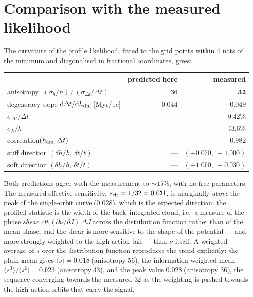 \documentclass[11pt,a4paper]{article}
\newcommand{\hdm}{h_{\rm dm}}
\newcommand{\dt}{\Delta t}
\begin{document}
\section{Comparison with the measured likelihood}

The curvature of the profile likelihood, fitted to the grid points within 4 nats
of the minimum and diagonalised in fractional coordinates, gives:

\begin{center}
\begin{tabular}{lrr}
\toprule
 & predicted here & measured \\
\midrule
anisotropy $\;(\sigma_h/h)\,/\,(\sigma_{\dt}/\dt)$ & $36$ & $\mathbf{32}$ \\
degeneracy slope $\mathrm{d}\dt/\mathrm{d}\hdm$ [Myr/pc] & $-0.044$ & $\mathbf{-0.049}$ \\
\midrule
$\sigma_{\dt}/\dt$ & --- & $0.42\%$ \\
$\sigma_{h}/h$ & --- & $13.6\%$ \\
correlation$(\hdm,\dt)$ & --- & $-0.982$ \\
stiff direction $(\delta h/h,\ \delta t/t)$ & --- & $(+0.030,\ +1.000)$ \\
soft direction $(\delta h/h,\ \delta t/t)$ & --- & $(+1.000,\ -0.030)$ \\
\bottomrule
\end{tabular}
\end{center}

\noindent Both predictions agree with the measurement to $\sim\!15\%$, with no
free parameters.  The measured effective sensitivity, $s_{\rm eff}=1/32=0.031$,
is marginally \emph{above} the peak of the single-orbit curve ($0.028$), which is
the expected direction: the profiled statistic is the width of the
back--integrated cloud, i.e.\ a measure of the phase \emph{shear}
$\dt\,(\partial\nu/\partial J)\,\Delta J$ across the distribution function rather
than of the mean phase, and the shear is more sensitive to the shape of the
potential --- and more strongly weighted to the high-action tail --- than $\nu$
itself.  A weighted average of $s$ over the distribution function reproduces the
trend explicitly: the plain mean gives $\langle s\rangle = 0.018$ (anisotropy
$56$), the information-weighted mean $\langle s^3\rangle/\langle s^2\rangle =
0.023$ (anisotropy $43$), and the peak value $0.028$ (anisotropy $36$), the
sequence converging towards the measured $32$ as the weighting is pushed towards
the high-action orbits that carry the signal.
\end{document}
